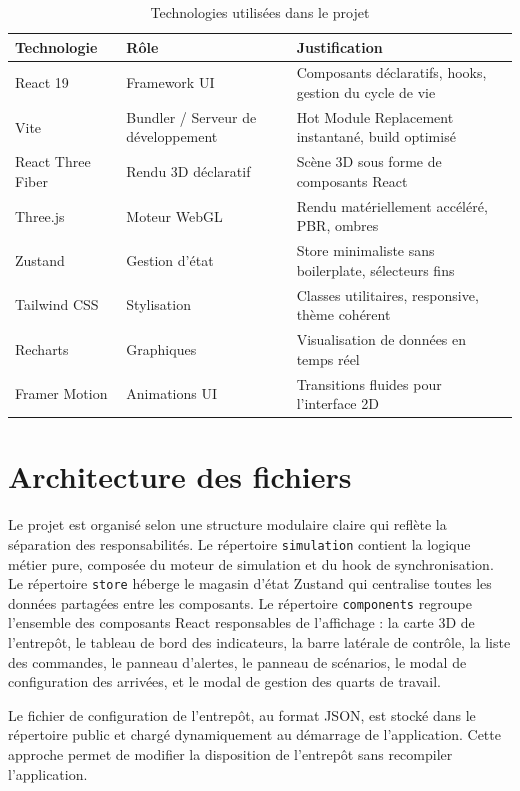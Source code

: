 \documentclass[12pt,a4paper]{report}
\begin{document}
\begin{table}[H]
\centering
\caption{Technologies utilis\'ees dans le projet}
\label{tab:technologies}
\begin{tabularx}{\textwidth}{|l|l|X|}
\hline
\textbf{Technologie} & \textbf{R\^ole} & \textbf{Justification} \\
\hline
React 19 & Framework UI & Composants d\'eclaratifs, hooks, gestion du cycle de vie \\
\hline
Vite & Bundler / Serveur de d\'eveloppement & Hot Module Replacement instantan\'e, build optimis\'e \\
\hline
React Three Fiber & Rendu 3D d\'eclaratif & Sc\`ene 3D sous forme de composants React \\
\hline
Three.js & Moteur WebGL & Rendu mat\'eriellement acc\'el\'er\'e, PBR, ombres \\
\hline
Zustand & Gestion d'\'etat & Store minimaliste sans boilerplate, s\'electeurs fins \\
\hline
Tailwind CSS & Stylisation & Classes utilitaires, responsive, th\`eme coh\'erent \\
\hline
Recharts & Graphiques & Visualisation de donn\'ees en temps r\'eel \\
\hline
Framer Motion & Animations UI & Transitions fluides pour l'interface 2D \\
\hline
\end{tabularx}
\end{table}

\section{Architecture des fichiers}

Le projet est organis\'e selon une structure modulaire claire qui refl\`ete la s\'eparation des responsabilit\'es. Le r\'epertoire \texttt{simulation} contient la logique m\'etier pure, compos\'ee du moteur de simulation et du hook de synchronisation. Le r\'epertoire \texttt{store} h\'eberge le magasin d'\'etat Zustand qui centralise toutes les donn\'ees partag\'ees entre les composants. Le r\'epertoire \texttt{components} regroupe l'ensemble des composants React responsables de l'affichage : la carte 3D de l'entrep\^ot, le tableau de bord des indicateurs, la barre lat\'erale de contr\^ole, la liste des commandes, le panneau d'alertes, le panneau de sc\'enarios, le modal de configuration des arriv\'ees, et le modal de gestion des quarts de travail.

Le fichier de configuration de l'entrep\^ot, au format JSON, est stock\'e dans le r\'epertoire public et charg\'e dynamiquement au d\'emarrage de l'application. Cette approche permet de modifier la disposition de l'entrep\^ot sans recompiler l'application.
\end{document}
